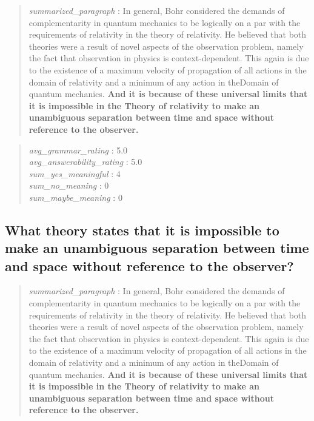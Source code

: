\begin{quote}
\emph{summarized\_paragraph} : In general, Bohr considered the demands
of complementarity in quantum mechanics to be logically on a par with
the requirements of relativity in the theory of relativity. He believed
that both theories were a result of novel aspects of the observation
problem, namely the fact that observation in physics is
context-dependent. This again is due to the existence of a maximum
velocity of propagation of all actions in the domain of relativity and a
minimum of any action in theDomain of quantum mechanics. \textbf{And it
is because of these universal limits that it is impossible in the Theory
of relativity to make an unambiguous separation between time and space
without reference to the observer.}
\end{quote}

\begin{quote}
\emph{avg\_grammar\_rating} : 5.0\\
\emph{avg\_answerability\_rating} : 5.0\\
\emph{sum\_yes\_meaningful} : 4\\
\emph{sum\_no\_meaning} : 0\\
\emph{sum\_maybe\_meaning} : 0
\end{quote}

\hypertarget{what-theory-states-that-it-is-impossible-to-make-an-unambiguous-separation-between-time-and-space-without-reference-to-the-observer-1}{%
\subsection{What theory states that it is impossible to make an
unambiguous separation between time and space without reference to the
observer?}\label{what-theory-states-that-it-is-impossible-to-make-an-unambiguous-separation-between-time-and-space-without-reference-to-the-observer-1}}

\begin{quote}
\emph{summarized\_paragraph} : In general, Bohr considered the demands
of complementarity in quantum mechanics to be logically on a par with
the requirements of relativity in the theory of relativity. He believed
that both theories were a result of novel aspects of the observation
problem, namely the fact that observation in physics is
context-dependent. This again is due to the existence of a maximum
velocity of propagation of all actions in the domain of relativity and a
minimum of any action in theDomain of quantum mechanics. \textbf{And it
is because of these universal limits that it is impossible in the Theory
of relativity to make an unambiguous separation between time and space
without reference to the observer.}
\end{quote}


